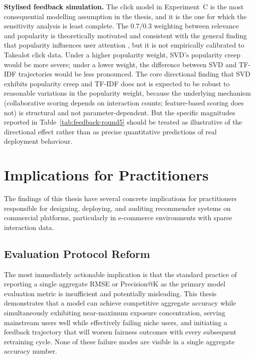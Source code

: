 \documentclass[11pt,a4paper]{report}
\begin{document}
\textbf{Stylised feedback simulation.} The click model in Experiment~C is the most consequential modelling assumption in the thesis, and it is the one for which the sensitivity analysis is least complete. The 0.7/0.3 weighting between relevance and popularity is theoretically motivated and consistent with the general finding that popularity influences user attention \citep{cialdini1984influence}, but it is not empirically calibrated to Takealot click data. Under a higher popularity weight, SVD's popularity creep would be more severe; under a lower weight, the difference between SVD and TF-IDF trajectories would be less pronounced. The core directional finding that SVD exhibits popularity creep and TF-IDF does not is expected to be robust to reasonable variations in the popularity weight, because the underlying mechanism (collaborative scoring depends on interaction counts; feature-based scoring does not) is structural and not parameter-dependent. But the specific magnitudes reported in Table~\ref{tab:feedback-round5} should be treated as illustrative of the directional effect rather than as precise quantitative predictions of real deployment behaviour.

\section{Implications for Practitioners}
\label{sec:disc_practitioners}

The findings of this thesis have several concrete implications for practitioners responsible for designing, deploying, and auditing recommender systems on commercial platforms, particularly in e-commerce environments with sparse interaction data.

\subsection*{Evaluation Protocol Reform}

The most immediately actionable implication is that the standard practice of reporting a single aggregate RMSE or Precision@K as the primary model evaluation metric is insufficient and potentially misleading. This thesis demonstrates that a model can achieve competitive aggregate accuracy while simultaneously exhibiting near-maximum exposure concentration, serving mainstream users well while effectively failing niche users, and initiating a feedback trajectory that will worsen fairness outcomes with every subsequent retraining cycle. None of these failure modes are visible in a single aggregate accuracy number.
\end{document}

